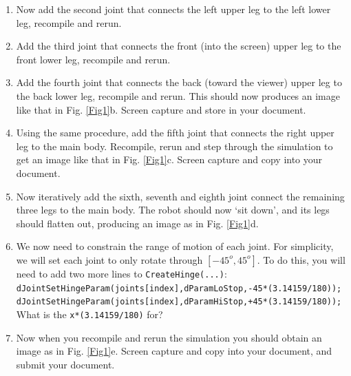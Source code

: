 \documentclass[12pt]{article}
\begin{document}
\begin{enumerate}
\item Now add the second joint that connects the left upper leg to the left lower leg, recompile and rerun.

\item Add the third joint that connects the front (into the screen) upper leg to the front lower leg, recompile and rerun.

\item Add the fourth joint that connects the back (toward the viewer) upper leg to the back lower leg, recompile and rerun. This should now produces an image like that in Fig. \ref{Fig1}b. Screen capture and store in your document.

\item Using the same procedure, add the fifth joint that connects the right upper leg to the main body. Recompile, rerun and step through the simulation to get an image like that in Fig. \ref{Fig1}c. Screen capture and copy into your document.

\item Now iteratively add the sixth, seventh and eighth joint connect the remaining three legs to the main body. The robot should now `sit down', and its legs should flatten out, producing an image as in Fig. \ref{Fig1}d.

\item We now need to constrain the range of motion of each joint. For simplicity, we will set each joint to only rotate through $[-45^o,45^o]$. To do this, you will need to add two more lines to \texttt{CreateHinge(...)}: \\
    \texttt{dJointSetHingeParam(joints[index],dParamLoStop,-45*(3.14159/180));} \\
    \texttt{dJointSetHingeParam(joints[index],dParamHiStop,+45*(3.14159/180));} \\
    What is the \texttt{x*(3.14159/180)} for?

\item Now when you recompile and rerun the simulation you should obtain an image as in Fig. \ref{Fig1}e. Screen capture and copy into your document, and submit your document.

\end{enumerate}
\end{document}
